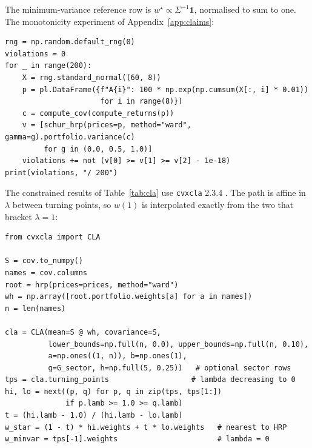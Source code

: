 \documentclass[11pt,a4paper]{article}
\newcommand{\code}[1]{\texttt{#1}}
\begin{document}
The minimum-variance reference row is
$w^{\star} \propto \Sigma^{-1} \mathbf{1}$, normalised to sum to one. The
monotonicity experiment of Appendix~\ref{app:claims}:

\begin{verbatim}
rng = np.random.default_rng(0)
violations = 0
for _ in range(200):
    X = rng.standard_normal((60, 8))
    p = pl.DataFrame({f"A{i}": 100 * np.exp(np.cumsum(X[:, i] * 0.01))
                      for i in range(8)})
    c = compute_cov(compute_returns(p))
    v = [schur_hrp(prices=p, method="ward", gamma=g).portfolio.variance(c)
         for g in (0.0, 0.5, 1.0)]
    violations += not (v[0] >= v[1] >= v[2] - 1e-18)
print(violations, "/ 200")
\end{verbatim}

The constrained results of Table~\ref{tab:cla} use \code{cvxcla} 2.3.4
\citep{cvxcla}. The
path is affine in $\lambda$ between turning points, so $w(1)$ is interpolated
exactly from the two that bracket $\lambda = 1$:

\begin{verbatim}
from cvxcla import CLA

S = cov.to_numpy()
names = cov.columns
root = hrp(prices=prices, method="ward")
wh = np.array([root.portfolio.weights[a] for a in names])
n = len(names)

cla = CLA(mean=S @ wh, covariance=S,
          lower_bounds=np.full(n, 0.0), upper_bounds=np.full(n, 0.10),
          a=np.ones((1, n)), b=np.ones(1),
          g=G_sector, h=np.full(5, 0.25))   # optional sector rows
tps = cla.turning_points                   # lambda decreasing to 0
hi, lo = next((p, q) for p, q in zip(tps, tps[1:])
              if p.lamb >= 1.0 >= q.lamb)
t = (hi.lamb - 1.0) / (hi.lamb - lo.lamb)
w_star = (1 - t) * hi.weights + t * lo.weights   # nearest to HRP
w_minvar = tps[-1].weights                       # lambda = 0
\end{verbatim}



\end{document}
